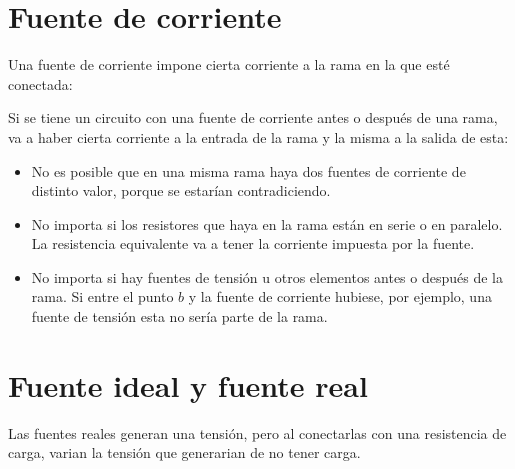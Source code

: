 \documentclass[a5paper,12pt,twoside]{book}
\begin{document}
\section{Fuente de corriente}

Una fuente de corriente impone cierta corriente a la rama en la que esté conectada:

\begin{center}
    \def\svgwidth{0.5\linewidth}
    
\end{center}

Si se tiene un circuito con una fuente de corriente antes o después de una rama, va a haber cierta corriente a la entrada de la rama y la misma a la salida de esta:

\begin{itemize}
\item No es posible que en una misma rama haya dos fuentes de corriente de distinto valor, porque se estarían contradiciendo.

\item No importa si los resistores que haya en la rama están en serie o en paralelo. La resistencia equivalente va a tener la corriente impuesta por la fuente.

\begin{multicols}{2}
    \begin{center}
        \def\svgwidth{0.9\linewidth}
        
    \end{center}
    \begin{center}
        \def\svgwidth{0.9\linewidth}
        
    \end{center}
\end{multicols}

\item No importa si hay fuentes de tensión u otros elementos antes o después de la rama. Si entre el punto $b$ y la fuente de corriente hubiese, por ejemplo, una fuente de tensión esta no sería parte de la rama.
\end{itemize}


\section{Fuente ideal y fuente real}

Las fuentes reales generan una tensión, pero al conectarlas con una resistencia de carga, varian la tensión que generarian de no tener carga.
\end{document}
